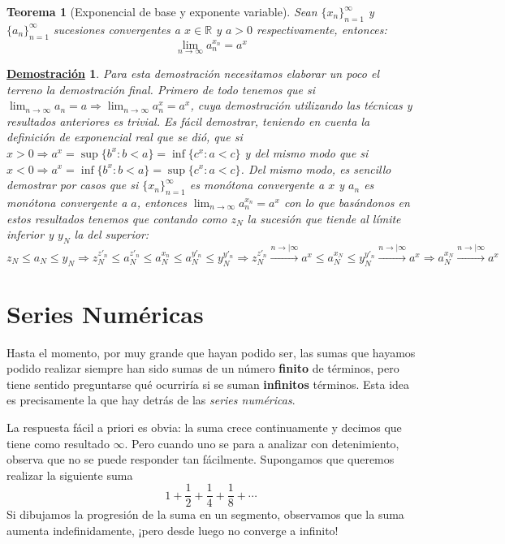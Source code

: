 \documentclass[10pt,a4paper,openright]{book}
\theoremstyle{break}
\newtheorem{theo}{Teorema}[chapter]
\newtheorem*{demo}{\underline{Demostración}}
\begin{document}
\begin{theo}[Exponencial de base y exponente variable]
Sean $\{x_n\}_{n=1}^\infty$ y $\{a_n\}_{n=1}^\infty$ sucesiones convergentes a $x\in \mathbb{R}$ y $a>0$ respectivamente, entonces:
\[
\lim_{n\rightarrow\infty}a_n^{x_n}=a^x
\]
\end{theo}
\begin{demo}
Para esta demostración necesitamos elaborar un poco el terreno la demostración final. Primero de todo tenemos que si $\lim_{n\rightarrow \infty} a_n=a\Rightarrow \lim_{n\rightarrow \infty}a_n^x=a^x$, cuya demostración utilizando las técnicas y resultados anteriores es trivial. Es fácil demostrar, teniendo en cuenta la definición de exponencial real que se dió, que si $x>0\Rightarrow a^x=\sup\{b^x: b<a\}=\inf\{c^x: a<c\}$ y del mismo modo que si $x<0\Rightarrow a^x=\inf\{b^x: b<a\}=\sup\{c^x: a<c\}$. Del mismo modo, es sencillo demostrar por casos que si $\{x_n\}_{n=1}^\infty$ es monótona convergente a $x$ y $a_n$ es monótona convergente a $a$, entonces $\lim_{n\rightarrow\infty} a_n^{x_n}=a^x$ con lo que basándonos en estos resultados tenemos que contando como $z_N$ la sucesión que tiende al límite inferior y $y_N$ la del superior:
$$z_N\leq a_N\leq y_N\Rightarrow z_N^{z'_n}\leq a_N^{z'_n}\leq a_N^{x_n}\leq a_N^{y'_n}\leq y_N^{y'_n}\Rightarrow z_N^{z'_n}\xrightarrow{n\rightarrow|\infty}a^x\leq a_N^{x_N}\leq y_N^{y'_n}\xrightarrow{n\rightarrow|\infty}a^x\Rightarrow a_N^{x_N}\xrightarrow{n\rightarrow|\infty}a^x$$
\end{demo}

\section{Series Numéricas}
Hasta el momento, por muy grande que hayan podido ser, las sumas que hayamos podido realizar siempre han sido sumas de un número \textbf{finito} de términos, pero tiene sentido preguntarse qué ocurriría si se suman \textbf{infinitos} términos. Esta idea es precisamente la que hay detrás de las \textit{series numéricas}.

La respuesta fácil a priori es obvia: la suma crece continuamente y decimos que tiene como resultado $\infty$. Pero cuando uno se para a analizar con detenimiento, observa que no se puede responder tan fácilmente. Supongamos que queremos realizar la siguiente suma
\[
1 + \frac{1}{2} + \frac{1}{4} + \frac{1}{8} + \cdots
\]
Si dibujamos la progresión de la suma en un segmento, observamos que la suma aumenta indefinidamente, ¡pero desde luego no converge a infinito!
\end{document}

